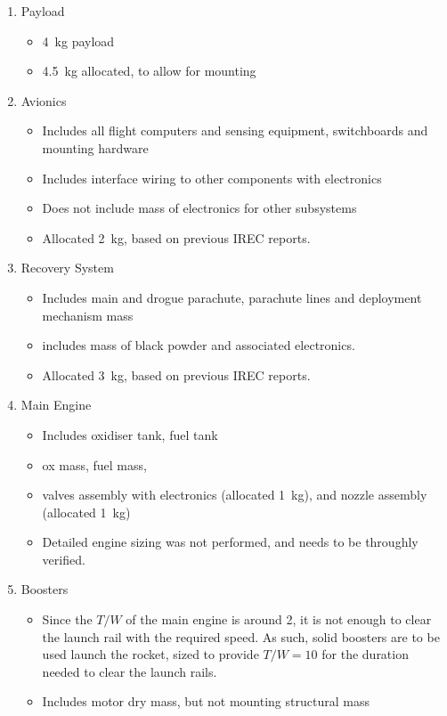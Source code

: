 \documentclass[12pt]{article}
\begin{document}
\begin{enumerate}

\item Payload
\begin{itemize}
\item 4~kg payload
\item 4.5~kg allocated, to allow for mounting
\end{itemize}

\item Avionics
\begin{itemize}
\item Includes all flight computers and sensing equipment, switchboards and mounting hardware
\item Includes interface wiring to other components with electronics
\item Does not include mass of electronics for other subsystems
\item Allocated 2~kg, based on previous IREC reports.
\end{itemize}

\item Recovery System
\begin{itemize}
\item Includes main and drogue parachute, parachute lines and deployment mechanism mass
\item includes mass of black powder and associated electronics. 
\item Allocated 3~kg, based on previous IREC reports.
\end{itemize}

\item Main Engine
\begin{itemize}
\item Includes oxidiser tank, fuel tank
\item ox mass, fuel mass, 
\item valves assembly with electronics (allocated 1~kg), and nozzle assembly (allocated 1~kg)
\item Detailed engine sizing was not performed, and needs to be throughly verified. 
\end{itemize}

\item Boosters
\begin{itemize}
\item Since the $T/W$ of the main engine is around 2, it is not enough to clear the launch rail with the required speed. As such, solid boosters are to be used launch the rocket, sized to provide $T/W = 10$ for the duration needed to clear the launch rails.
\item Includes motor dry mass, but not mounting structural mass
\end{itemize}


\end{enumerate}
\end{document}
